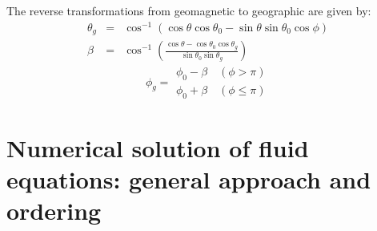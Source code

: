 \documentclass[11pt,letterpaper]{article}
\begin{document}
The reverse transformations from geomagnetic to geographic are given by:  
\begin{eqnarray}
\theta_g &=& \cos^{-1} \left( \cos \theta \cos \theta_0 - \sin \theta \sin \theta_0 \cos \phi \right) \\
\beta &=& \cos^{-1} \left( \frac{\cos \theta - \cos \theta_0 \cos \theta_g}{\sin \theta_0 \sin \theta_g} \right)
\end{eqnarray}
\begin{equation}
\phi_g= 
\begin{array}{c}
\phi_0 - \beta \quad (\phi > \pi) \\
\phi_0 + \beta \quad (\phi \le \pi)
\end{array}
\end{equation}


\section{Numerical solution of fluid equations:  general approach and ordering}
\end{document}
